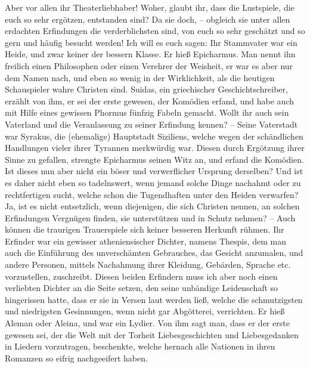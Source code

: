 \medskip

Aber vor allen ihr Theaterliebhaber! Woher, glaubt ihr,
dass die Lustspiele, die
euch so sehr ergötzen, entstanden sind? Da sie doch, -- obgleich sie unter allen
erdachten Erfindungen die verderblichsten sind, von euch so sehr geschätzt und
so gern und häufig besucht werden! Ich will es euch sagen: Ihr Stammvater war
ein Heide, und zwar keiner der bessern Klasse. Er hieß
Epicharmus. Man nennt ihn
freilich einen Philosophen oder einen Verehrer der Weisheit,
er war es aber nur
dem Namen nach, und eben so wenig in der Wirklichkeit, als die heutigen
Schauspieler wahre Christen sind. Suidas, ein
griechischer Geschichtschreiber,
erzählt von ihm, er sei der erste gewesen, der Komödien erfand, und habe auch
mit Hilfe eines gewissen Phormus fünfzig Fabeln
gemacht. Wollt ihr auch sein
Vaterland und die Veranlassung zu seiner Erfindung kennen? -- Seine Vaterstadt
war Syrakus, die (ehemalige) Hauptstadt
Siziliens, welche wegen der schändlichen
Handlungen vieler ihrer Tyrannen merkwürdig war. Diesen durch Ergötzung ihrer
Sinne zu gefallen, strengte Epicharmus seinen Witz
an, und erfand die Komödien.
Ist dieses nun aber nicht ein böser und verwerflicher Ursprung derselben? Und
ist es daher nicht eben so tadelnswert, wenn jemand solche Dinge nachahmt oder
zu rechtfertigen sucht, welche schon die Tugendhaften unter den Heiden
verwarfen? Ja, ist es nicht entsetzlich, wenn diejenigen, die sich Christen
nennen, an solchen Erfindungen Vergnügen finden, sie unterstützen und in Schutz
nehmen? -- Auch können die traurigen Trauerspiele sich keiner besseren Herkunft
rühmen. Ihr Erfinder war ein gewisser atheniensischer Dichter, namens
Thespis, dem man auch die Einführung des unverschämten
Gebrauches, das Gesicht anzumalen,
und andere Personen, mittels Nachahmung ihrer Kleidung, Gebärden, Sprache etc.
vorzustellen, zuschreibt. Diesen beiden Erfindern muss ich aber noch einen
verliebten Dichter an die Seite setzen, den seine unbändige Leidenschaft so
hingerissen hatte, dass er sie in Versen laut werden ließ, welche die
schmutzigsten und niedrigsten Gesinnungen, wenn nicht gar Abgötterei,
verrichten.
Er hieß Aleman oder Aleina, und
war ein Lydier. Von ihm sagt man, dass er der
erste gewesen sei, der die Welt mit der Torheit Liebesgeschichten und
Liebesgedanken in Liedern vorzutragen, beschenkte, welche hernach alle Nationen
in ihren Romanzen so eifrig nachgeeifert haben.

